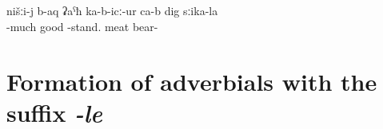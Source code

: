 \begin{exe}
	\ex	\label{ex:listDegreeAdverbs}
	\begin{xlist}
		\TabPositions{14em}
		  \tab {}  \\
		  \tab {}  \\
          \tab {} 
		\end{xlist}
\end{exe}


\begin{exe}
		\ex	\label{ex:‎‎We liked the meat of the bear very much}
	\gll	nišːi-j	b-aq	ʡaˁħ	ka-b-icː-ur ca-b	dig	sːika-la	\\
		 	-much	good	-stand. 	meat	bear- \\
	\glt	{}
	\end{exe}
	

\section{Formation of adverbials with the suffix \textit{-le}}
\label{sec:FormationOfAdverbialsWithTheSuffixLe}

